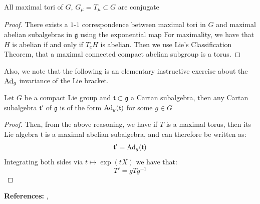 \begin{theorem}
All maximal tori of $G$, $G_{\mu} = T_{\mu} \subset G$ are conjugate 
\end{theorem}

\begin{proof}
There exists a $1$-$1$ correspondence between maximal tori in $G$ and maximal abelian subalgebras in $\mathfrak{g}$ using the exponential map For maximality, we have that $H$ is abelian if and only if $T_{e}H$ is abelian. Then we use Lie's Classification Theorem, that a maximal connected compact abelian subgroup is a torus.
\end{proof}

\begin{remark}
Also, we note that the following is an elementary instructive exercise about the $\operatorname{Ad}_{g}$ invariance of the Lie bracket.
\end{remark}

\begin{lemma}
Let $G$ be a compact Lie group and $\mathfrak{t} \subset \mathfrak{g}$ a Cartan subalgebra, then any Cartan subalgebra $\mathfrak{t}'$ of $\mathfrak{g}$ is of the form $\operatorname{Ad}_{g}(\mathfrak{t})$ for some $g \in G$ 
\end{lemma}

\begin{proof}
Then, from the above reasoning, we have if $T$ is a maximal torus, then its Lie algebra $\mathfrak{t}$ is a maximal abelian subalgebra, and can therefore be written as:
\begin{equation}
\mathfrak{t}' = \operatorname{Ad}_{g}(\mathfrak{t})
\end{equation}
Integrating both sides via $t \mapsto \exp(tX)$ we have that:
\begin{equation}
T' = gTg^{-1}
\end{equation}
\end{proof}
\noindent \textbf{References:} \textcite{Wildberger1992}, \textcite{WangZuoqinLieGroups2013}
